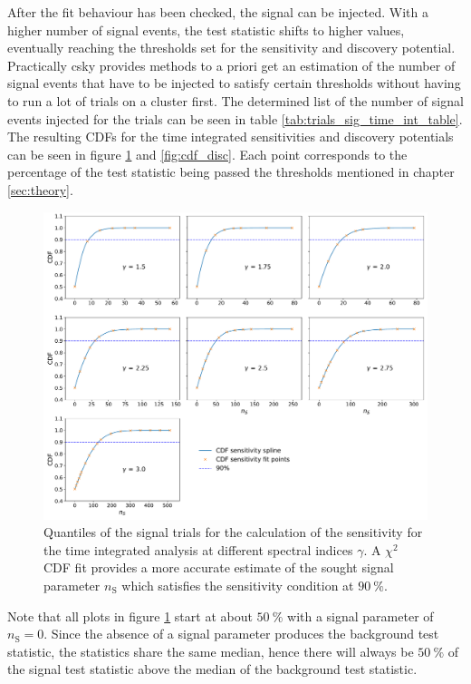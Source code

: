 After the fit behaviour has been checked, the signal can be injected.
With a higher number of signal events, the test statistic shifts to higher values, eventually reaching the thresholds set for the sensitivity and discovery potential.
Practically csky provides methods to a priori get an estimation of the number of signal events that have to be injected to satisfy certain thresholds without having to run a lot of trials on a cluster first.
The determined list of the number of signal events injected for the trials can be seen in table \ref{tab:trials_sig_time_int_table}.
The resulting CDFs for the time integrated sensitivities and discovery potentials can be seen in figure \ref{fig:cdf_sens} and \ref{fig:cdf_disc}.
Each point corresponds to the percentage of the test statistic being passed the thresholds mentioned in chapter \ref{sec:theory}.
\begin{figure}
    \centering
    \includegraphics[width=\linewidth]{Plots/05_csky/9_years_gfu_gold_cdf_sens.pdf}
    \caption{Quantiles of the signal trials for the calculation of the sensitivity for the time integrated analysis at different spectral indices $\gamma$. A $\chi^2$ CDF fit provides a more accurate estimate of the sought signal parameter $n_\text{S}$ which satisfies the sensitivity condition at $\SI{90}{\percent}$.}
    \label{fig:cdf_sens}
\end{figure}
Note that all plots in figure \ref{fig:cdf_sens} start at about $\SI{50}{\percent}$ with a signal parameter of $n_\text{S} = 0$.
Since the absence of a signal parameter produces the background test statistic, the statistics share the same median, hence there will always be $\SI{50}{\percent}$ of the signal test statistic above the median of the background test statistic.
